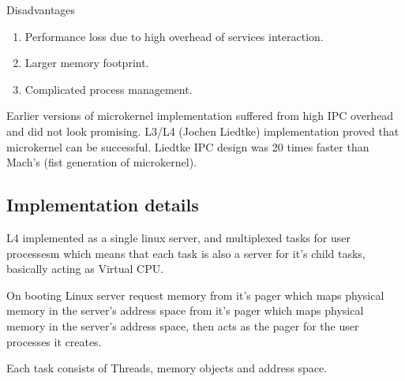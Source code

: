\documentclass{article}
\begin{document}
        Disadvantages
        \begin{enumerate}[-, leftmargin = 0.7cm, nosep]
            \item Performance loss due to high overhead of services interaction.
        \item Larger memory footprint.  \item Complicated process management.  \end{enumerate}

            Earlier versions of microkernel implementation suffered from high IPC overhead and
        did not look promising. L3/L4 (Jochen Liedtke) implementation proved that microkernel can be successful.
        Liedtke IPC design was 20 times faster than Mach's (fist generation of microkernel).


        \pagebreak

        \subsection{Implementation details}
        L4 implemented as a single linux server, and multiplexed tasks for user processesm
        which means that each task is also a server for it's child tasks, basically acting as Virtual CPU.

        On booting Linux server request memory from it's pager which maps physical memory in
        the server's address space from it's pager which maps physical memory in the
        server's address space, then acts as the pager for the user processes it creates.

        Each task consists of Threads, memory objects and address space. 
        
\end{document}
